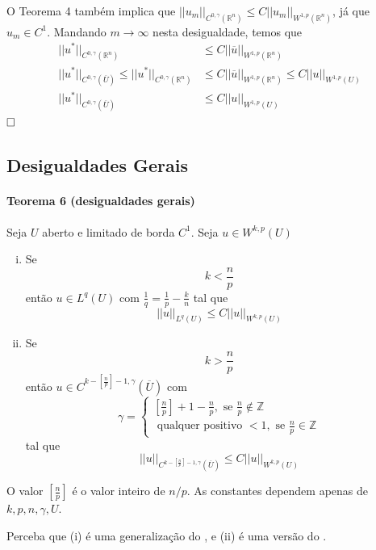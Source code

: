 \documentclass[11pt]{article}
\newcommand{\qed}{$\hfill\square$}
\newcommand{\Z}{\mathbb{Z}}
\newcommand{\prn}{{(\mathbb{R}^n)}}
\begin{document}
O Teorema 4 também implica que $||u_m||_{C^{0,\gamma}\prn} \leq C ||u_m||_{W^{1,p}\prn}$, já que $u_m \in C^1$. Mandando $m \rightarrow \infty$ nesta desigualdade, temos que \begin{align*}
	 ||u^*||_{C^{0,\gamma}\prn} &\leq  C ||\overline{u}||_{W^{1,p}\prn}  \\
	  ||u^*||_{C^{0,\gamma}(\overline{U})}  \leq ||u^*||_{C^{0,\gamma}\prn} &\leq  C ||\overline{u}||_{W^{1,p}\prn} \leq C ||u||_{W^{1,p}(U)} \\
	  ||u^*||_{C^{0,\gamma}(\overline{U})}  &\leq C ||u||_{W^{1,p}(U)}
\end{align*}
\qed


\subsection{Desigualdades Gerais}

\paragraph{Teorema 6 (desigualdades gerais)} Seja $U$ aberto e limitado de borda $C^1$. Seja $u \in W^{k,p}(U)$

\begin{enumerate}[(i)]
	\item Se \[ k < \frac{n}{p} \] então \(u \in L^q(U) \) com \( \frac{1}{q} = \frac{1}{p} - \frac{k}{n}\) tal que \[ ||u||_{L^q(U)} \leq C ||u||_{W^{k,p}(U)} \]
	
	\item Se \[ k > \frac{n}{p} \] então \(u \in C^{k- \left[\frac{n}{p}\right] - 1, \gamma}(\overline{U})\) com \[ \gamma = \begin{cases}
		\left[\frac{n}{p}\right] + 1 - \frac{n}{p}, \text{ se } \frac{n}{p} \notin\Z \\
		\text{ qualquer positivo } < 1, \text{ se } \frac{n}{p} \in \Z
	\end{cases} \] tal que \[ ||u||_{C^{k- \left[\frac{n}{p}\right] - 1, \gamma}(\overline{U})} \leq C ||u||_{W^{k,p}(U)} \]
\end{enumerate}

O valor $ \left[\frac{n}{p}\right] $ é o valor inteiro de $n/p$. As constantes dependem apenas de $k,p,n,\gamma, U$.

Perceba que (i) é uma generalização do , e (ii) é uma versão do .
\end{document}
